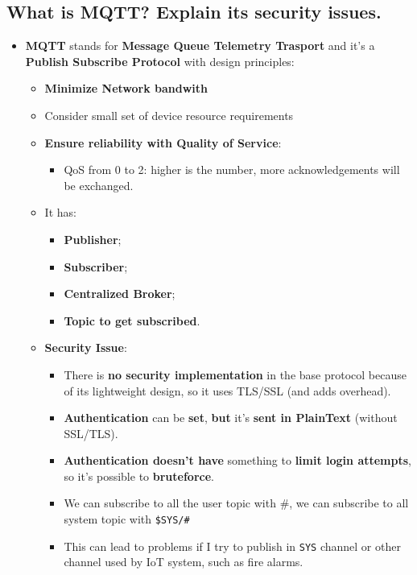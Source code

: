 \documentclass[9pt, letterpaper]{article}
\begin{document}
\subsection{What is MQTT? Explain its security issues.}
\begin{itemize}
	\item \textbf{MQTT} stands for \textbf{Message Queue Telemetry Trasport} and it's a \textbf{Publish Subscribe Protocol} with design principles:
	\begin{itemize}
		\item \textbf{Minimize Network bandwith}
		\item Consider small set of device resource requirements
		\item \textbf{Ensure reliability with Quality of Service}:
		\begin{itemize}
			\item QoS from 0 to 2: higher is the number, more acknowledgements will be exchanged.
		\end{itemize}
		\item It has:
		\begin{itemize}
			\item \textbf{Publisher};
			\item \textbf{Subscriber};
			\item \textbf{Centralized Broker};
			\item \textbf{Topic to get subscribed}.
		\end{itemize}
		\item \textbf{Security Issue}:
		\begin{itemize}
			\item There is \textbf{no security implementation} in the base protocol because of its lightweight design, so it uses TLS/SSL (and adds overhead).
			\item \textbf{Authentication} can be \textbf{set}, \textbf{but} it's \textbf{sent in PlainText} (without SSL/TLS).
			\item \textbf{Authentication doesn't have} something to \textbf{limit login attempts}, so it's possible to \textbf{bruteforce}.
			\item We can subscribe to all the user topic with \#, we can subscribe to all system topic with {\tt \$SYS/\#}
			\item This can lead to problems if I try to publish in {\tt SYS} channel or other channel used by IoT system, such as fire alarms.
		\end{itemize}	
	\end{itemize}
\end{itemize}
\end{document}
